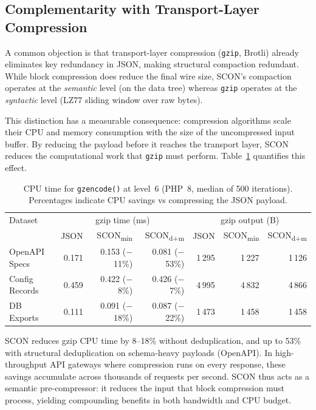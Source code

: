 \documentclass[11pt, a4paper]{article}
\begin{document}
\subsection{Complementarity with Transport-Layer Compression}
\label{sec:gzip}

A common objection is that transport-layer compression (\texttt{gzip},
Brotli) already eliminates key redundancy in JSON, making structural
compaction redundant. While block compression does reduce the final
wire size, SCON's compaction operates at the \emph{semantic} level
(on the data tree) whereas \texttt{gzip} operates at the
\emph{syntactic} level (LZ77 sliding window over raw bytes).

This distinction has a measurable consequence: compression algorithms
scale their CPU and memory consumption with the size of the
uncompressed input buffer. By reducing the payload before it reaches
the transport layer, SCON reduces the computational work that
\texttt{gzip} must perform. Table~\ref{tab:gzip-cpu} quantifies
this effect.

\begin{table}[ht]
\centering
\caption{CPU time for \texttt{gzencode()} at level~6 (PHP~8, median
         of 500 iterations). Percentages indicate CPU savings vs
         compressing the JSON payload.}
\label{tab:gzip-cpu}
\begin{tabular}{l rrr rrr}
\toprule
Dataset
  & \multicolumn{3}{c}{gzip time (ms)}
  & \multicolumn{3}{c}{gzip output (B)} \\
  & JSON & SCON\textsubscript{min} & SCON\textsubscript{d+m}
  & JSON & SCON\textsubscript{min} & SCON\textsubscript{d+m} \\
\midrule
OpenAPI Specs
  & 0.171 & 0.153 \scriptsize($-$11\%)
  & 0.081 \scriptsize($-$53\%)
  & 1\,295 & 1\,227 & 1\,126 \\
Config Records
  & 0.459 & 0.422 \scriptsize($-$8\%)
  & 0.426 \scriptsize($-$7\%)
  & 4\,995 & 4\,832 & 4\,866 \\
DB Exports
  & 0.111 & 0.091 \scriptsize($-$18\%)
  & 0.087 \scriptsize($-$22\%)
  & 1\,473 & 1\,458 & 1\,458 \\
\bottomrule
\end{tabular}
\end{table}

\noindent SCON reduces gzip CPU time by 8--18\% without deduplication,
and up to 53\% with structural deduplication on schema-heavy payloads
(OpenAPI). In high-throughput API gateways where compression runs on
every response, these savings accumulate across thousands of requests
per second. SCON thus acts as a semantic pre-compressor: it reduces
the input that block compression must process, yielding compounding
benefits in both bandwidth and CPU budget.
\end{document}
